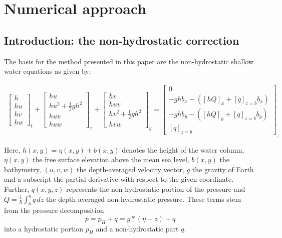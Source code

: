 
\section{Numerical approach}
\subsection{Introduction: the non-hydrostatic correction}
The basis for the method presented in this paper are the non-hydrostatic shallow water equations as given by:

\begin{align}
\boxed{
{\begin{bmatrix}
h \\
hu\\
hv\\
hw
\end{bmatrix}}_{t}
+
{\begin{bmatrix}
hu \\
hu^2+\frac{1}{2}gh^2\\
huv\\
huw
\end{bmatrix}}_{x}
+
{\begin{bmatrix}
hv \\
huv\\
hv^2+\frac{1}{2}gh^2\\
hvw
\end{bmatrix}}_{y}
=
{\begin{bmatrix}
0 \\
-ghb_x -\left([hQ]_x+[q]_{z=b}b_x \right)\\
-ghb_y -\left([hQ]_y+[q]_{z=b}b_y \right)\\
[q]_{z=b}
\end{bmatrix}_.}}
\label{eq:govern}
\end{align}

Here, $h (x,y)=\eta (x,y) +b(x,y)$ denotes the height of the water column, $\eta (x,y)$ the free surface elevation above the mean sea level, $b (x,y)$ the bathymetry, $(u,v,w)$ the depth-averaged velocity vector, $g$ the gravity of Earth and a subscript the partial derivative with respect to the given coordinate. Further, $q (x,y,z)$ represents the non-hydrostatic portion of the pressure and $Q=\frac{1}{h} \int_{b}^{\eta} q \, dz$ the depth averaged non-hydrostatic pressure. These terms stem from the pressure decomposition
\begin{equation}
p= p_H + q = g* (\eta -z) +q
\end{equation}
into a hydrostatic portion $p_H$ and a non-hydrostatic part $q$.


